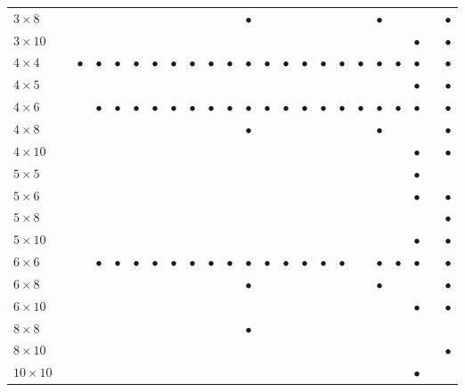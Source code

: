 \begin{table}[htbp]
\begin{tabular}{lcccccccccccccccccccccc}
$3\times8$  &  &  &  &  &  &  &  &  &  &  & $\bullet$ &  &  &  &  &  &  & $\bullet$ &  &  &  & $\bullet$ \\
$3\times10$ &  &  &  &  &  &  &  &  &  &  &  &  &  &  &  &  &  &  &  & $\bullet$ &  & $\bullet$ \\
$4\times4$  &  & $\bullet$ & $\bullet$ & $\bullet$ & $\bullet$ & $\bullet$ & $\bullet$ & $\bullet$ & $\bullet$ & $\bullet$ & $\bullet$ & $\bullet$ & $\bullet$ & $\bullet$ & $\bullet$ & $\bullet$ & $\bullet$ & $\bullet$ & $\bullet$ & $\bullet$ &  & $\bullet$ \\
$4\times5$  &  &  &  &  &  &  &  &  &  &  &  &  &  &  &  &  &  &  &  & $\bullet$ &  & $\bullet$ \\
$4\times6$  &  &  & $\bullet$ & $\bullet$ & $\bullet$ & $\bullet$ & $\bullet$ & $\bullet$ & $\bullet$ & $\bullet$ & $\bullet$ & $\bullet$ & $\bullet$ & $\bullet$ & $\bullet$ & $\bullet$ & $\bullet$ & $\bullet$ & $\bullet$ & $\bullet$ &  & $\bullet$ \\
$4\times8$  &  &  &  &  &  &  &  &  &  &  & $\bullet$ &  &  &  &  &  &  & $\bullet$ &  &  &  & $\bullet$ \\
$4\times10$ &  &  &  &  &  &  &  &  &  &  &  &  &  &  &  &  &  &  &  & $\bullet$ &  & $\bullet$ \\
$5\times5$  &  &  &  &  &  &  &  &  &  &  &  &  &  &  &  &  &  &  &  & $\bullet$ &  &  \\
$5\times6$  &  &  &  &  &  &  &  &  &  &  &  &  &  &  &  &  &  &  &  & $\bullet$ &  & $\bullet$ \\
$5\times8$  &  &  &  &  &  &  &  &  &  &  &  &  &  &  &  &  &  &  &  &  &  & $\bullet$ \\
$5\times10$ &  &  &  &  &  &  &  &  &  &  &  &  &  &  &  &  &  &  &  & $\bullet$ &  & $\bullet$ \\
$6\times6$  &  &  & $\bullet$ & $\bullet$ & $\bullet$ & $\bullet$ & $\bullet$ & $\bullet$ & $\bullet$ & $\bullet$ & $\bullet$ & $\bullet$ & $\bullet$ & $\bullet$ & $\bullet$ & $\bullet$ &  & $\bullet$ & $\bullet$ & $\bullet$ &  & $\bullet$ \\
$6\times8$  &  &  &  &  &  &  &  &  &  &  & $\bullet$ &  &  &  &  &  &  & $\bullet$ &  &  &  & $\bullet$ \\
$6\times10$ &  &  &  &  &  &  &  &  &  &  &  &  &  &  &  &  &  &  &  & $\bullet$ &  & $\bullet$ \\
$8\times8$  &  &  &  &  &  &  &  &  &  &  & $\bullet$ &  &  &  &  &  &  &  &  &  &  &  \\
$8\times10$ &  &  &  &  &  &  &  &  &  &  &  &  &  &  &  &  &  &  &  &  &  & $\bullet$ \\
$10\times10$&  &  &  &  &  &  &  &  &  &  &  &  &  &  &  &  &  &  &  & $\bullet$ &  &  \\
\bottomrule
\end{tabular}
\end{table}
